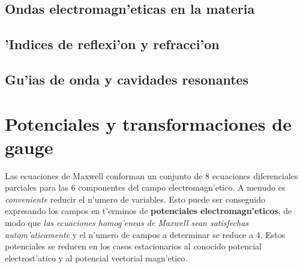 \subsection{Ondas electromagn'eticas en la materia}
\subsection{'Indices de reflexi'on y refracci'on}
\subsection{Gu'ias de onda y cavidades resonantes}


\section{Potenciales y transformaciones de gauge}

Las ecuaciones de Maxwell conforman un conjunto de 8 ecuaciones diferenciales
parciales para las 6 componentes del campo electromagn'etico. A menudo es
\textit{conveniente} reducir el n'umero de variables. Esto puede ser conseguido
expresando los campos en t'erminos de \textbf{potenciales electromagn'eticos},
de modo que \textit{las ecuaciones homog'eneas de Maxwell sean satisfechas
autom'aticamente} y el n'umero de campos a determinar se reduce a 4. Estos
potenciales se reducen en los casos estacionarios al conocido potencial
electrost'atico y al potencial vectorial magn'etico.

